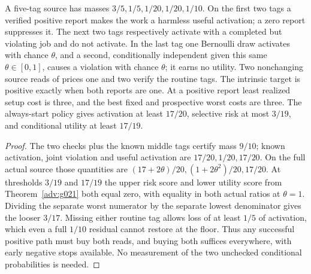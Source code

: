 \begin{proposition}\label{adv:g024}
A five-tag source has masses \(3/5,1/5,1/20,1/20,1/10\). On the first two tags a verified positive report makes the work a harmless useful activation; a zero report suppresses it. The next two tags respectively activate with a completed but violating job and do not activate. In the last tag one Bernoulli draw activates with chance \(\theta\), and a second, conditionally independent given this same \(\theta\in[0,1]\), causes a violation with chance \(\theta\); it earns no utility. Two nonchanging source reads of prices one and two verify the routine tags. The intrinsic target is positive exactly when both reports are one. At a positive report least realized setup cost is three, and the best fixed and prospective worst costs are three. The always-start policy gives activation at least \(17/20\), selective risk at most \(3/19\), and conditional utility at least \(17/19\).
\end{proposition}
\begin{proof}
The two checks plus the known middle tags certify mass \(9/10\); known activation, joint violation and useful activation are \(17/20,1/20,17/20\). On the full actual source those quantities are \((17+2\theta)/20,(1+2\theta^2)/20,17/20\). At thresholds \(3/19\) and \(17/19\) the upper risk score and lower utility score from Theorem~\ref{adv:g021} both equal zero, with equality in both actual ratios at \(\theta=1\). Dividing the separate worst numerator by the separate lowest denominator gives the looser \(3/17\). Missing either routine tag allows loss of at least \(1/5\) of activation, which even a full \(1/10\) residual cannot restore at the floor. Thus any successful positive path must buy both reads, and buying both suffices everywhere, with early negative stops available. No measurement of the two unchecked conditional probabilities is needed.
\end{proof}
